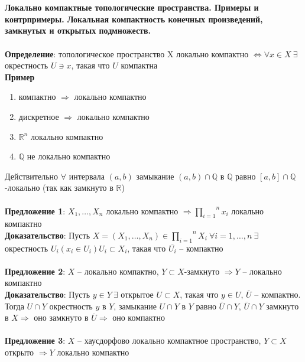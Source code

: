 \section{}
	\textbf{Локально компактные топологические пространства. Примеры и контрпримеры. Локальная компактность конечных произведений, замкнутых и открытых подмножеств.}\\
	\\
		\textbf{Определение}: топологическое пространство X локально компактно $\Leftrightarrow \forall x \in X\ \exists$
	окрестность $U \ni x$, такая что $U$ компактна\\
	\textbf{Пример} 
	\begin{enumerate}
		\item 
		компактно $\Rightarrow$ локально компактно
		\item 
		дискретное $\Rightarrow$ локально компактно
		\item 
		$\mathbb{R}^n$ локально компактно
		\item 
		$\mathbb{Q}$ не локально компактно
	\end{enumerate}
	Действительно $\forall $ интервала $(a,b)$ замыкание $(a,b)\cap \mathbb{Q}$ в $\mathbb{Q}$ равно $[a,b]\cap \mathbb{Q}$-локально (так как замкнуто в $\mathbb{R}$)\\
	\\
	\textbf{Предложение 1}: $X_1, \ldots , X_n$ локально компактно $\Rightarrow \overset{n}{\underset{i = 1}{\prod}} x_i$ локально компактно\\
	\textbf{Доказательство}: Пусть $X = (X_1,\ldots , X_n)\in \overset{n}{\underset{i = 1}{\prod}} X_i\ \forall i = 1,\ldots,n\ \exists$ окрестность $U_i(x_i\in U_i) U_i \subset X_i$, такая что $\overline{U_i}$ -- компактно\\
	\\
	\textbf{Предложение 2}: $X$ -- локально компактно, $Y \subset X$-замкнуто $\Rightarrow Y$ -- локально компактно\\
	\textbf{Доказательство}: Пусть $y\in Y\ \exists$ открытое $U\subset X$, такая что $y\in U$, $\overline{U}$ -- компактно. Тогда $U\cap Y$ окрестность $y$ в $Y$, замыкание $U\cap Y$ в $Y$ равно $\overline{U}\cap Y$, $\overline{U}\cap Y$ замкнуто в $X \Rightarrow$ оно замкнуто в $\overline{U} \Rightarrow$ оно компактно\\
	\\
	\textbf{Предложение 3}: $X$ -- хаусдорфово локально компактное пространство, $Y\subset X$ открыто $\Rightarrow Y$ локально компактно\\
	\\
